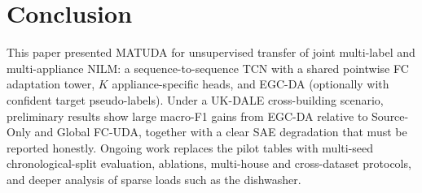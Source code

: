 \documentclass[journal]{IEEEtran}
\begin{document}
\section{Conclusion}
This paper presented MATUDA for unsupervised transfer of joint multi-label and multi-appliance NILM: a sequence-to-sequence TCN with a shared pointwise FC adaptation tower, $K$ appliance-specific heads, and EGC-DA (optionally with confident target pseudo-labels).
Under a UK-DALE cross-building scenario, preliminary results show large macro-F1 gains from EGC-DA relative to Source-Only and Global FC-UDA, together with a clear SAE degradation that must be reported honestly.
Ongoing work replaces the pilot tables with multi-seed chronological-split evaluation, ablations, multi-house and cross-dataset protocols, and deeper analysis of sparse loads such as the dishwasher.
\end{document}
